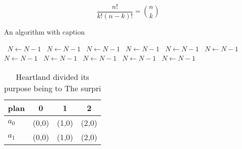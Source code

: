 \documentclass[a4paper]{article}
\begin{document}
\[ \frac{n!}{k!(n-k)!} = \binom{n}{k} \]

\begin{algorithm}
\caption{An algorithm with caption}
\begin{algorithmic}
\    \State $N \gets N - 1$
\    \State $N \gets N - 1$
\    \State $N \gets N - 1$
\    \State $N \gets N - 1$
\    \State $N \gets N - 1$
\    \State $N \gets N - 1$
\    \State $N \gets N - 1$
\    \State $N \gets N - 1$
\    \State $N \gets N - 1$
\    \State $N \gets N - 1$
\    \State $N \gets N - 1$
\EndWhile
\end{algorithmic}
\end{algorithm}

\begin{table}
\begin{adjustbox}{width=0.6\columnwidth}
\begin{tabular}{|l|l|l|l|}
\hline
\textbf{plan} & \multicolumn{1}{c|}{\textbf{0}} & \multicolumn{1}{c|}{\textbf{1}} & \multicolumn{1}{c|}{\textbf{2}} \\ \hline
\textbf{$a_0$}  & (0,0) & (1,0) & (2,0) \\ \hline
\textbf{$a_1$}  & (0,0) & (1,0) & (2,0) \\ \hline
\end{tabular}
\end{adjustbox}
\caption{Heartland divided its purpose being to The surpri
}
\end{table}
\end{document}

